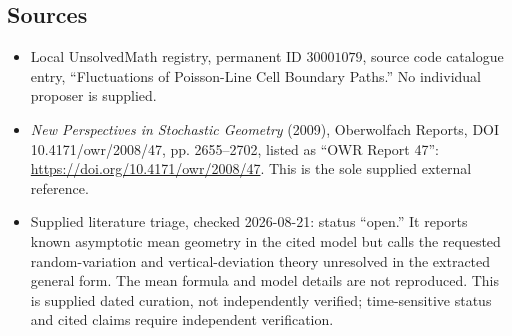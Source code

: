 \documentclass[11pt]{article}
\begin{document}
\subsection{Sources}
\begin{itemize}
\item Local UnsolvedMath registry, permanent ID \(30001079\), source code catalogue entry, ``Fluctuations of Poisson-Line Cell Boundary Paths.'' No individual proposer is supplied.
\item \emph{New Perspectives in Stochastic Geometry} (2009), Oberwolfach Reports, DOI 10.4171/owr/2008/47, pp. 2655--2702, listed as ``OWR Report 47'': \url{https://doi.org/10.4171/owr/2008/47}. This is the sole supplied external reference.
\item Supplied literature triage, checked 2026-08-21: status ``open.'' It reports known asymptotic mean geometry in the cited model but calls the requested random-variation and vertical-deviation theory unresolved in the extracted general form. The mean formula and model details are not reproduced. This is supplied dated curation, not independently verified; time-sensitive status and cited claims require independent verification.
\end{itemize}
\end{document}
